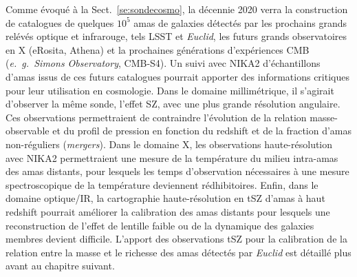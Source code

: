 Comme évoqué à la Sect.~\ref{se:sondecosmo}, la décennie 2020 verra la
construction de catalogues de quelques $10^5$ amas de galaxies
détectés par les prochains grands relévés optique et infrarouge, tels
LSST et \emph{Euclid}, les futurs grands observatoires en X (eRosita,
Athena) et la prochaines générations d'expériences CMB
(\emph{e.~g.~}\emph{Simons Observatory}, CMB-S4). Un suivi avec NIKA2 
d'échantillons d'amas issus de ces futurs catalogues pourrait apporter
des informations critiques pour leur utilisation en cosmologie. Dans
le domaine millimétrique, il s'agirait d'observer la même sonde,
l'effet SZ, avec une plus grande résolution angulaire. Ces
observations permettraient de contraindre l'évolution de la relation
masse-observable et du profil de pression en fonction du redshift et
de la fraction d'amas non-réguliers (\emph{mergers}). Dans le domaine
X, les observations haute-résolution avec NIKA2 permettraient une
mesure de la température du milieu intra-amas des amas distants, pour
lesquels les temps d'observation nécessaires à une mesure
spectroscopique de la température deviennent rédhibitoires. 
Enfin, dans le domaine optique/IR, la cartographie haute-résolution en
tSZ d'amas à haut redshift pourrait améliorer la calibration des amas
distants pour lesquels une reconstruction de l'effet de lentille
faible ou de la dynamique des galaxies membres devient
difficile. L'apport des observations tSZ pour la calibration de la
relation entre la masse et le richesse des amas détectés par
\emph{Euclid} est détaillé plus avant au chapitre suivant. 




